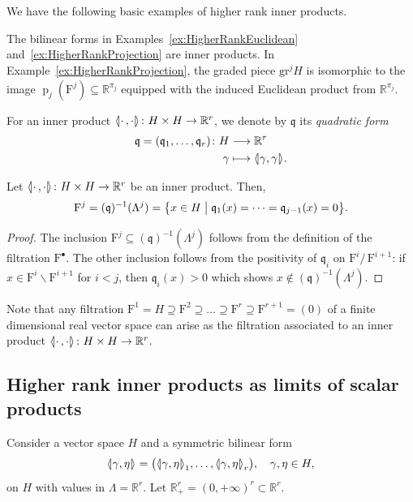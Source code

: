 \documentclass[AHL,Unicode,longabstracts]{cedram}
\newcommand{\llangle}{\mathopen{\langle\mkern -3.1mu\lvert}}
\newcommand{\rrangle}{\mathclose{\rvert\mkern -3.1mu\rangle}}
\newcommand{\highinn}[2]{{\llangle#2\rrangle_{#1}}}
\newcommand{\rquot}[2]{#1/\,#2}
\DeclareMathOperator{\projeuc}{p}
\newcommand{\filter}{\mathrm{F}}
\newcommand{\R}{\mathbb{R}}
\newcommand{\grm}[2]{\mathrm{gr}_{#1}^{#2}}
\newcommand{\qf}{\mathfrak{q}}
\renewcommand{\setminus}{\smallsetminus}
\renewcommand*{\to}{\mathchoice{\longrightarrow}{\rightarrow}{\rightarrow}{\rightarrow}}
\let\oldmapsto\mapsto
\renewcommand*{\mapsto}{\mathchoice{\longmapsto}{\oldmapsto}{\oldmapsto}{\oldmapsto}}
\begin{document}
We have the following basic examples of higher rank inner products.

\begin{exam}
The bilinear forms in Examples~\ref{ex:HigherRankEuclidean} and~\ref{ex:HigherRankProjection} are inner products. In Example~\ref{ex:HigherRankProjection}, the graded piece $\grm{}{j} H$ is isomorphic to the image $\projeuc_{j}(\filter^j) \subseteq \R^{\pi_j}$ equipped with the induced Euclidean product from $\R^{\pi_j}$.%
\end{exam}

\begin{defi} For an inner product $\highinn{}{\cdot\,, \cdot} \colon H \times H \to \R^r$, we denote by $\qf$ its \emph{quadratic form}
\begin{align*}
\qf = (\qf_1, \dots, \qf_r) \colon H &\to  \R^r \\
\gamma &\mapsto \highinn{}{\gamma,\gamma}.%
\end{align*}
\end{defi}

\begin{prop}
Let $\highinn{}{\cdot\,, \cdot} \colon H \times H \to \R^r$ be an inner product. Then,
\[
\filter^j = (\qf)^{-1}(\Lambda^j) = \bigl\{x \in H \bigm| \qf_1(x)=\dots=\qf_{j-1}(x)=0\bigr\}.
\]
\end{prop}

\begin{proof}
The inclusion $\filter^j\subseteq (\qf)^{-1}(\Lambda^j)$ follows from the definition of the filtration $\filter^\bullet$. The other inclusion follows from the positivity of $\qf_i$ on $\rquot{\filter^i}{\filter^{i+1}}$: if $x \in \filter^i \setminus \filter^{i+1}$ for $i<j$, then $\qf_i(x)>0$ which shows $x \notin (\qf)^{-1}(\Lambda^j)$.
\end{proof}

\begin{rema}\label{rem:filtration-realizability}
Note that any filtration $\filter^1=H \supseteq \filter^2 \supseteq \dots \supseteq \filter^r \supseteq \filter^{r+1} =(0)$ of a finite dimensional real vector space can arise as the filtration associated to an inner product $\highinn{}{\cdot\,,\cdot} \colon H\times H \to \R^r$.%
\end{rema}


\subsection{Higher rank inner products as limits of scalar products}\label{ss:PullbackFamilies}
Consider a vector space $H$ and a symmetric bilinear form
\begin{align*}
\highinn{}{\gamma, \eta} = \bigl({\highinn{1}{\gamma, \eta}}, \dots, \highinn{r}{\gamma, \eta}\bigr), \quad \gamma, \eta \in H,
\end{align*}
on $H$ with values in $\Lambda = \R^r$. Let $\R_+^r=(0,+\infty)^r \subset \R^r$.
\end{document}
